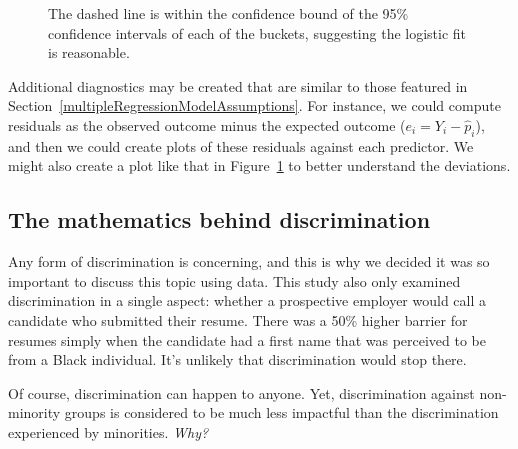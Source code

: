 \begin{figure}
  \centering
  \caption{The dashed line is within the confidence bound
       of the 95\% confidence intervals of each of the buckets,
       suggesting the logistic fit is reasonable.}
  \label{logisticModelBucketDiag}
\end{figure}

Additional diagnostics may be created that are similar to those
featured in Section~\ref{multipleRegressionModelAssumptions}.
For instance, we could compute residuals as
the observed outcome minus the expected outcome
($e_i = Y_i - \hat{p}_i$),
and then we could create plots of these residuals
against each predictor.
We might also create a plot like that in
Figure~\ref{logisticModelBucketDiag}
to better understand the deviations.



\newpage

\subsection{The mathematics behind discrimination}


Any form of discrimination is concerning,
and this is why we decided it was so important to discuss
this topic using data.
This study also only examined discrimination in a
single aspect: whether a prospective employer would
call a candidate who submitted their resume.
There was a 50\% higher barrier for resumes simply when
the candidate had a first name that was perceived to be
from a Black individual.
It's unlikely that discrimination would stop there.

Of course, discrimination can happen to anyone.
Yet, discrimination against non-minority groups is
considered to be much less impactful than
the discrimination experienced by minorities.
\emph{Why?}

